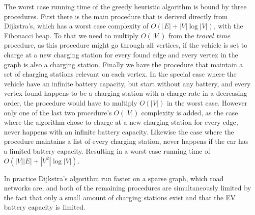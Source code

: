 The worst case running time of the greedy heuristic algorithm is bound by three procedures. First there is the main procedure that is derived directly from Dijkstra's, which has a worst case complexity of $O(|E|+|V|\log|V|)$, with the Fibonacci heap. To that we need to multiply $O(|V|)$ from the $travel\_time$ procedure, as this procedure might go through all vertices, if the vehicle is set to charge at a new charging station for every found edge and every vertex in the graph is also a charging station. Finally we have the procedure that maintain a set of charging stations relevant on each vertex. In the special case where the vehicle have an infinite battery capacity, but start without any battery, and every vertex found happens to be a charging station with a charge rate in a decreasing order, the procedure would have to multiply $O(|V|)$ in the worst case.
However only one of the last two procedure's $O(|V|)$ complexity is added, as the case where the algorithm chose to charge at a new charging station for every edge, never happens with an infinite battery capacity. Likewise the case where the procedure maintains a list of every charging station, never happens if the car has a limited battery capacity. Resulting in a worst case running time of $O(|V||E|+|V^2|\log|V|)$. %


In practice Dijkstra's algorithm run faster on a sparse graph, which road networks are, and both of the remaining procedures are simultaneously limited by the fact that only a small amount of charging stations exist and that the EV battery capacity is limited.